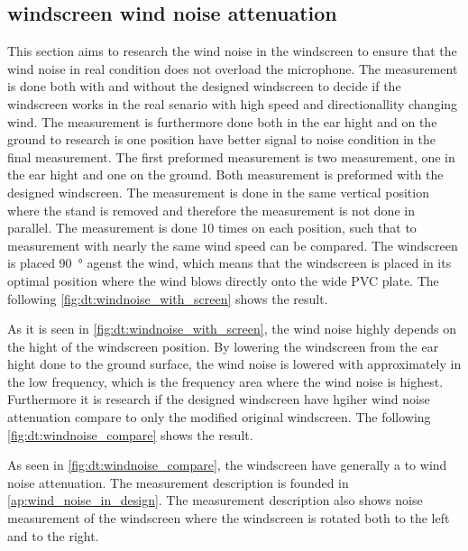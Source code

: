 \subsection{windscreen wind noise attenuation}\label{sec:ds:wind_noi_att}
This section aims to research the wind noise in the windscreen to ensure that the wind noise in real condition does not overload the microphone. The measurement is done both with and without the designed windscreen to decide if the windscreen works in the real senario with high speed and directionallity changing wind. The measurement is furthermore done both in the ear hight and on the ground to research is one position have better signal to noise condition in the final measurement. The first preformed measurement is two measurement, one in the ear hight and one on the ground. Both measurement is preformed with the designed windscreen. The measurement is done in the same vertical position where the stand is removed and therefore the measurement is not done in parallel. The measurement is done 10 times on each position, such that to measurement with nearly the same wind speed can be compared. The windscreen is placed \SI{90}{\degree} agenst the wind, which means that the windscreen is placed in its optimal position where the wind blows directly onto the wide PVC plate. The following \autoref{fig:dt:windnoise_with_screen} shows the result.


As it is seen in \autoref{fig:dt:windnoise_with_screen}, the wind noise highly depends on the hight of the windscreen position. By lowering the windscreen from the ear hight done to the ground surface, the wind noise is lowered with approximately  in the low frequency, which is the frequency area where the wind noise is highest. Furthermore it is research if the designed windscreen have hgiher wind noise attenuation compare to only the modified original windscreen. The following \autoref{fig:dt:windnoise_compare} shows the result.
 

As seen in \autoref{fig:dt:windnoise_compare}, the windscreen have generally a  to  wind noise attenuation. The measurement description is founded in \autoref{ap:wind_noise_in_design}. The measurement description also shows noise measurement of the windscreen where the windscreen is rotated both to the left and to the right. 




